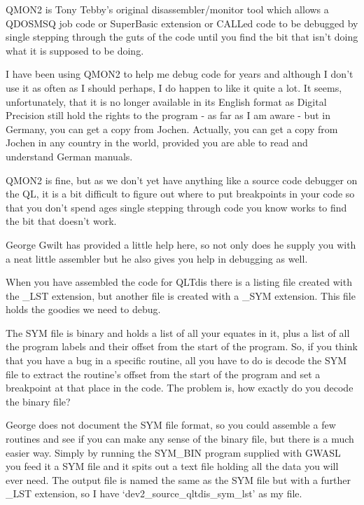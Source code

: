 \begin{appendix}
QMON2 is Tony Tebby's original disassembler/monitor tool which allows a QDOSMSQ
job code or SuperBasic extension or CALLed code to be debugged by single
stepping through the guts of the code until you find the bit that isn't doing
what it is supposed to be doing.

I have been using QMON2 to help me debug code for years and although I don't use
it as often as I should perhaps, I do happen to like it quite a lot. It seems,
unfortunately, that it is no longer available in its English format as Digital
Precision still hold the rights to the program -{} as far as I am aware -{} but in
Germany, you can get a copy from Jochen. Actually, you can get a copy from
Jochen in any country in the world, provided you are able to read and understand
German manuals.

QMON2 is fine, but as we don't yet have anything like a source code debugger on
the QL, it is a bit difficult to figure out where to put breakpoints in your
code so that you don't spend ages single stepping through code you know works to
find the bit that doesn't work.

George Gwilt has provided a little help here, so not only does he supply you
with a neat little assembler but he also gives you help in debugging as well.

When you have assembled the code for QLTdis there is a listing file created with
the \_LST extension, but another file is created with a \_SYM extension. This file
holds the goodies we need to debug.

The SYM file is binary and holds a list of all your equates in it, plus a list
of all the program labels and their offset from the start of the program. So, if
you think that you have a bug in a specific routine, all you have to do is
decode the SYM file to extract the routine's offset from the start of the
program and set a breakpoint at that place in the code. The problem is, how
exactly do you decode the binary file?

George does not document the SYM file format, so you could assemble a few
routines and see if you can make any sense of the binary file, but there is a
much easier way. Simply by running the SYM\_BIN program supplied with GWASL you
feed it a SYM file and it spits out a text file holding all the data you will
ever need. The output file is named the same as the SYM file but with a further
\_LST extension, so I have `dev2\_source\_qltdis\_sym\_lst' as my file.


\end{appendix}
